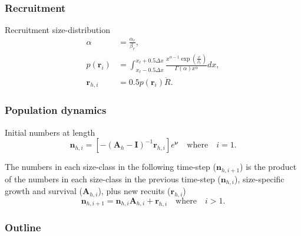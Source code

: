 \documentclass{beamer}
\begin{document}

\begin{frame}
\frametitle{Recruitment}

Recruitment size-distribution
\begin{align*}
  \alpha &= \frac{\alpha_r}{\beta_r},\\
  p(\boldsymbol{r}_i) &= \int^{x_\ell+0.5 \Delta x}_{x_\ell-0.5 \Delta x}
  \frac{x^{\alpha-1} \exp
    \left(\frac{x}{\beta_r}\right)}{\Gamma (\alpha) x^\alpha} dx,\\
  \boldsymbol{r}_{h,i} &= 0.5 p(\boldsymbol{r}_i) \ddot{R}.
\end{align*}

\end{frame}


\begin{frame}
\frametitle{Population dynamics}

Initial numbers at length
\begin{equation*}
  \boldsymbol{n}_{h,i} = \left[-\left( \boldsymbol{A}_{h} - \boldsymbol{I}
    \right)^{-1} \boldsymbol{r}_{h,i} \right] e^{\boldsymbol\nu} \quad
  \text{where} \quad i=1.
\end{equation*}

The numbers in each size-class in the following time-step
($\boldsymbol{n}_{h,i+1}$) is the product of the numbers in each size-class in
the previous time-step ($\boldsymbol{n}_{h,i}$), size-specific growth and
survival ($\boldsymbol{A}_{h,i}$), plus new recuits ($\boldsymbol{r}_{h,i}$)
\begin{equation*}
  \boldsymbol{n}_{h,i+1} = \boldsymbol{n}_{h,i} \boldsymbol{A}_{h,i} +
  \boldsymbol{r}_{h,i} \quad \text{where} \quad i > 1.
\end{equation*}



\end{frame}


\begin{frame}
\frametitle{Outline}
\tableofcontents
\end{frame}

\end{document}
